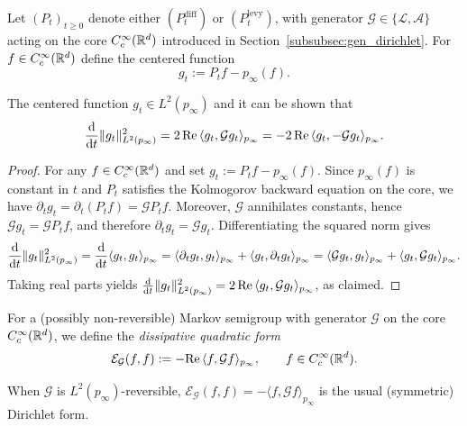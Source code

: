 \begin{definition}
Let $(P_t)_{t\ge 0}$ denote either $(P_t^{\mathrm{diff}})$ or $(P_t^{\mathrm{levy}})$, with generator
$\mathcal{G}\in\{\mathcal{L},\mathcal{A}\}$ acting on the core $C_c^\infty(\mathbb{R}^d)$ introduced in
Section~\ref{subsubsec:gen_dirichlet}. For $f\in C_c^\infty(\mathbb{R}^d)$ define the centered function
\[
g_t:=P_t f-p_\infty(f).
\]
\end{definition}
\begin{proposition}
    The centered function $g_t\in L^2(p_\infty)$ and it can be shown that
\begin{equation}\label{eq:L2_energy_identity}
\frac{\mathrm{d}}{\mathrm{d} t}\|g_t\|_{L^2(p_\infty)}^2
=
2\,\mathrm{Re}\,\langle g_t,\mathcal{G}g_t\rangle_{p_\infty}
=
-2\,\mathrm{Re}\,\langle g_t,-\mathcal{G}g_t\rangle_{p_\infty}.
\end{equation}
\end{proposition}

\begin{proof}
For any $f\in C_c^\infty(\mathbb{R}^d)$ and set $g_t:=P_t f-p_\infty(f)$. Since $p_\infty(f)$ is constant in $t$ and $P_t$
satisfies the Kolmogorov backward equation on the core, we have
$\partial_t g_t=\partial_t(P_t f)=\mathcal{G}P_t f$. Moreover, $\mathcal{G}$ annihilates constants, hence
$\mathcal{G}g_t=\mathcal{G}P_t f$, and therefore $\partial_t g_t=\mathcal{G}g_t$. Differentiating the squared norm gives
\[
\frac{\mathrm{d}}{\mathrm{d} t}\|g_t\|_{L^2(p_\infty)}^2
=
\frac{\mathrm{d}}{\mathrm{d} t}\langle g_t,g_t\rangle_{p_\infty}
=
\langle \partial_t g_t,g_t\rangle_{p_\infty}+\langle g_t,\partial_t g_t\rangle_{p_\infty}
=
\langle \mathcal{G}g_t,g_t\rangle_{p_\infty}+\langle g_t,\mathcal{G}g_t\rangle_{p_\infty}.
\]
Taking real parts yields
$\frac{\mathrm{d}}{\mathrm{d} t}\|g_t\|_{L^2(p_\infty)}^2
=2\,\mathrm{Re}\,\langle g_t,\mathcal{G}g_t\rangle_{p_\infty}$, as claimed.
\end{proof}

\begin{definition}
For a (possibly non-reversible) Markov semigroup with generator $\mathcal G$ on the core $C_c^\infty(\mathbb{R}^d)$,
we define the \emph{dissipative quadratic form}
\begin{equation}\label{eq:dissipative_form_general}
\mathcal{E}_{\mathcal G}(f,f)
:=
-\mathrm{Re}\,\langle f,\mathcal G f\rangle_{p_\infty},
\qquad f\in C_c^\infty(\mathbb{R}^d).
\end{equation}
\end{definition}
When $\mathcal G$ is $L^2(p_\infty)$-reversible, $\mathcal{E}_{\mathcal G}(f,f)=-\langle f,\mathcal G f\rangle_{p_\infty}$
is the usual (symmetric) Dirichlet form.

